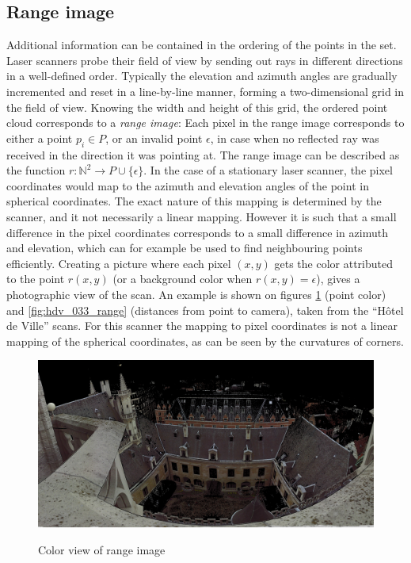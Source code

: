 \subsection{Range image}
Additional information can be contained in the ordering of the points in the set. Laser scanners probe their field of view by sending out rays in different directions in a well-defined order. Typically the elevation and azimuth angles are gradually incremented and reset in a line-by-line manner, forming a two-dimensional grid in the field of view. Knowing the width and height of this grid, the ordered point cloud corresponds to a \emph{range image}: Each pixel in the range image corresponds to either a point $p_i \in P$, or an invalid point $\epsilon$, in case when no reflected ray was received in the direction it was pointing at. The range image can be described as the function $r : \mathbb{N}^2 \rightarrow P \cup \{ \epsilon \}$. In the case of a stationary laser scanner, the pixel coordinates would map to the azimuth and elevation angles of the point in spherical coordinates. The exact nature of this mapping is determined by the scanner, and it not necessarily a linear mapping. However it is such that a small difference in the pixel coordinates corresponds to a small difference in azimuth and elevation, which can for example be used to find neighbouring points efficiently. Creating a picture where each pixel $(x, y)$ gets the color attributed to the point $r(x, y)$ (or a background color when $r(x, y) = \epsilon$), gives a photographic view of the scan. An example is shown on figures \ref{fig:hdv_033_color} (point color) and \ref{fig:hdv_033_range} (distances from point to camera), taken from the ``Hôtel de Ville'' scans. For this scanner the mapping to pixel coordinates is not a linear mapping of the spherical coordinates, as can be seen by the curvatures of corners.

\begin{figure}[p]
\center
\includegraphics[width=.8\textwidth]{fig/hdv_033_color.jpg}
\label{fig:hdv_033_color}
\caption{Color view of range image}
\end{figure}

